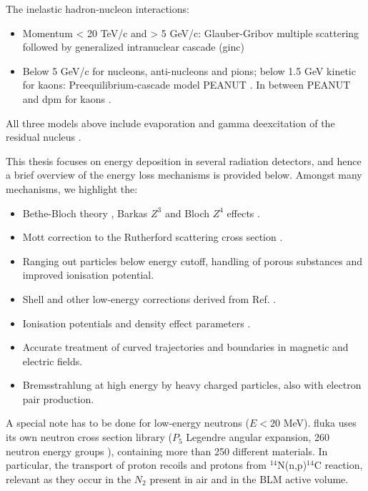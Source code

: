 \documentclass[encoding=utf8,british]{tumphthesis}
\begin{document}
The inelastic hadron-nucleon interactions: 
\begin{itemize}
    \item Momentum < 20 TeV/c and > 5 GeV/c: Glauber-Gribov multiple scattering followed by generalized intranuclear cascade (\acrshort{ginc}) 
    \item Below 5 GeV/c for nucleons, anti-nucleons and pions; below 1.5 GeV kinetic for kaons: Preequilibrium-cascade model PEANUT \cite{Ferrari:1993xr, Fasso:2724814}. In between PEANUT and \acrshort{dpm} for kaons \cite{Han:79}. 
\end{itemize}
All three models above include evaporation and gamma deexcitation of the residual nucleus \cite{Ferrari_1996}.

This thesis focuses on energy deposition in several radiation detectors, and hence a brief overview of the energy loss mechanisms is provided below. Amongst many mechanisms, we highlight the:
\begin{itemize}
    \item Bethe-Bloch theory \cite{Bethe-bloch}, Barkas $Z^3$ \cite{PhysRev.101.778} and Bloch $Z^4$ effects \cite{Bloch:1933zza}.
    \item Mott correction to the Rutherford scattering cross section \cite{doi:10.1142/9789812794086_0003}.
    \item Ranging out particles below energy cutoff, handling of porous substances and improved ionisation potential.
    \item Shell and other low-energy corrections derived from Ref.   \cite{nla.cat-vn125402}. 
    \item Ionisation potentials and density effect parameters \cite{Sternheimer:1983mb}.
    \item Accurate treatment of curved trajectories and boundaries in magnetic and electric fields.
    \item Bremsstrahlung at high energy by heavy charged particles, also with electron pair production.
\end{itemize}

A special note has to be done for low-energy neutrons ($E<20$ MeV). \acrshort{fluka} uses its own neutron cross section library ($P_5$ Legendre angular expansion, 260 neutron energy groups \cite{Sternheimer:1983mb}), containing more than 250 different materials. In particular, the transport of proton recoils and protons from $^{14}$N(n,p)$^{14}$C reaction, relevant as they occur in the $N_2$ present in air and in the BLM active volume. 
\end{document}
